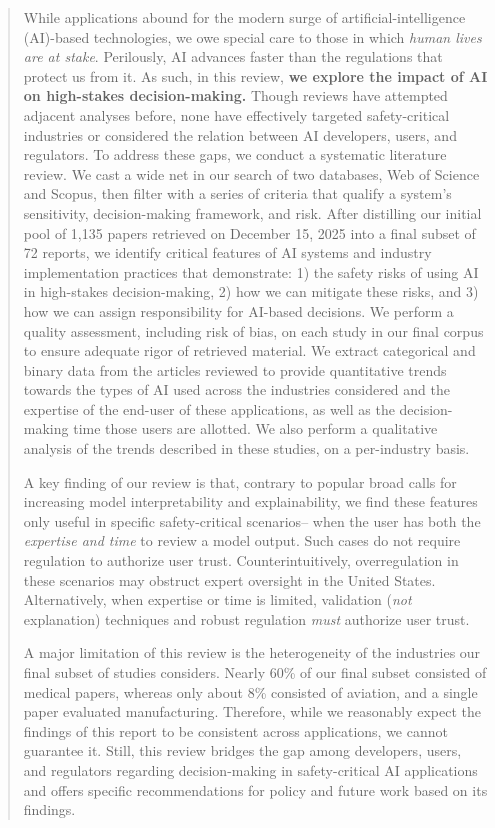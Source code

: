 \documentclass[authoryear,preprint,12pt]{elsarticle}
\begin{document}
\begin{frontmatter}
\begin{abstract}
While applications abound for the modern surge of artificial-intelligence
(AI)-based technologies, we owe special care to those in which \textit{human
lives are at stake}. Perilously, AI advances faster than the regulations that
protect us from it. As such, in this review, \textbf{we explore the impact of AI
on high-stakes decision-making.} 
Though reviews have attempted adjacent analyses before, none have effectively
targeted safety-critical industries or considered the relation between AI
developers, users, and regulators.
To address these gaps, we conduct a systematic literature review. We cast a wide
net in our search of two databases, Web of Science and Scopus, then filter with a series of criteria that qualify a system's
sensitivity, decision-making framework, and risk. After distilling our initial
pool of 1,135 papers retrieved on December 15, 2025 into a final subset of 72 reports, we identify critical
features of AI systems and industry implementation practices that demonstrate:
1) the safety risks of using AI in high-stakes decision-making, 2) how we can
mitigate these risks, and 3) how we can assign responsibility for AI-based
decisions. We perform a quality assessment, including risk of bias, on each study in our final corpus to ensure adequate rigor of retrieved material. We extract categorical and binary data from the articles reviewed to provide quantitative trends towards the types of AI used across the industries considered and the expertise of the end-user of these applications, as well as the decision-making time those users are allotted. We also perform a qualitative analysis of the trends described in these studies, on a per-industry basis. 

A key finding of our review is that, contrary to popular broad calls for
increasing model interpretability and explainability, we find these features
only useful in specific safety-critical scenarios-- when the user has both the
\textit{expertise and time} to review a model output. Such cases do not require
regulation to authorize user trust. Counterintuitively, overregulation in these
scenarios may obstruct expert oversight in the United States. Alternatively,
when expertise or time is limited, validation (\textit{not} explanation)
techniques and robust regulation \textit{must} authorize user trust. 

A major limitation of this review is the heterogeneity of the industries our
final subset of studies considers. Nearly 60\% of our final subset consisted of
medical papers, whereas only about 8\% consisted of aviation, and a single paper
evaluated manufacturing. Therefore, while we reasonably expect the findings of
this report to be consistent across applications, we cannot guarantee it. Still,
this review bridges the gap among developers, users, and regulators regarding
decision-making in safety-critical AI applications and offers specific
recommendations for policy and future work based on its findings.


\end{abstract}
\end{frontmatter}
\end{document}
